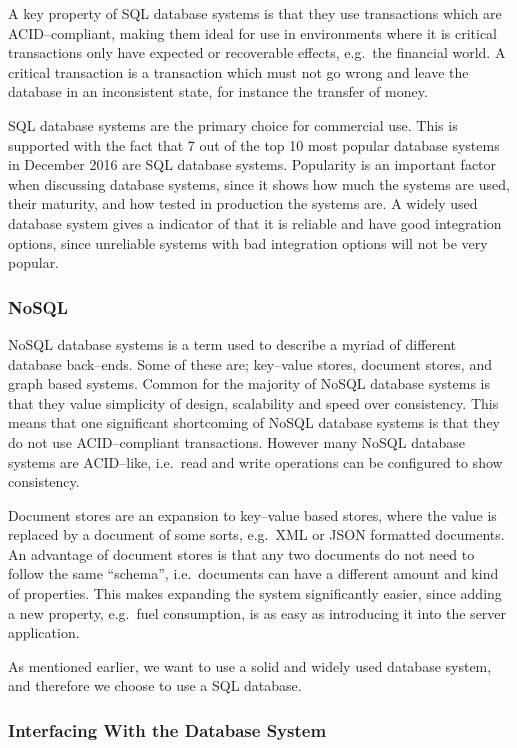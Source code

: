 A key property of SQL database systems is that they use transactions which are ACID--compliant\cite{Haerder:1983:PTD:289.291}, making them ideal for use in environments where it is critical transactions only have expected or recoverable effects, e.g.~the financial world.
A critical transaction is a transaction which must not go wrong and leave the database in an inconsistent state, for instance the transfer of money.

SQL database systems are the primary choice for commercial use\cite{dbs_concepts}.
This is supported with the fact that 7 out of the top 10 most popular database systems in December 2016 are SQL database systems\cite{DB_RANKINGS}.
Popularity is an important factor when discussing database systems, since it shows how much the systems are used, their maturity, and how tested in production the systems are.
A widely used database system gives a indicator of that it is reliable and have good integration options,
since unreliable systems with bad integration options will not be very popular. 

\subsubsection*{NoSQL}
NoSQL database systems is a term used to describe a myriad of different database back--ends.
Some of these are; key--value stores, document stores, and graph based systems.
Common for the majority of NoSQL database systems is that they value simplicity of design, scalability and speed over consistency.
This means that one significant shortcoming of NoSQL database systems is that they do not use ACID--compliant transactions.
However many NoSQL database systems are ACID--like, i.e.~read and write operations can be configured to show consistency.

Document stores are an expansion to key--value based stores, where the value is replaced by a document of some sorts, e.g.~XML or JSON formatted documents.
An advantage of document stores is that any two documents do not need to follow the same ``schema'', i.e.~documents can have a different amount and kind of properties.
This makes expanding the system significantly easier, since adding a new property, e.g.~fuel consumption, is as easy as introducing it into the server application.

\bigskip
As mentioned earlier, we want to use a solid and widely used database system, and therefore we choose to use a SQL database.

\subsubsection*{Interfacing With the Database System} %

